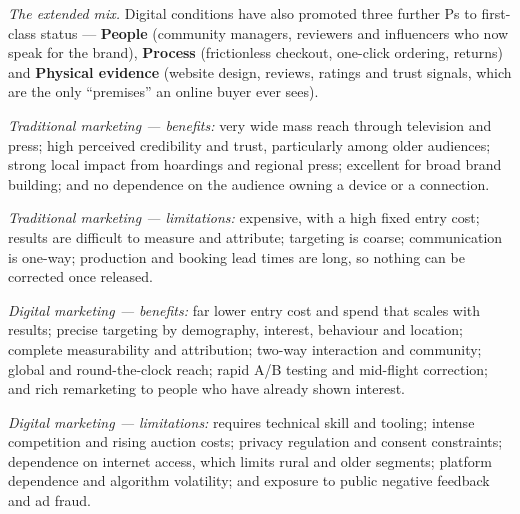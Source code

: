 \begin{qlist}
\textit{The extended mix.} Digital conditions have also promoted three further
Ps to first-class status --- \textbf{People} (community managers, reviewers and
influencers who now speak for the brand), \textbf{Process} (frictionless
checkout, one-click ordering, returns) and \textbf{Physical evidence} (website
design, reviews, ratings and trust signals, which are the only ``premises'' an
online buyer ever sees).

\textit{Traditional marketing --- benefits:} very wide mass reach through
television and press; high perceived credibility and trust, particularly among
older audiences; strong local impact from hoardings and regional press;
excellent for broad brand building; and no dependence on the audience owning a
device or a connection.

\textit{Traditional marketing --- limitations:} expensive, with a high fixed
entry cost; results are difficult to measure and attribute; targeting is coarse;
communication is one-way; production and booking lead times are long, so nothing
can be corrected once released.

\textit{Digital marketing --- benefits:} far lower entry cost and spend that
scales with results; precise targeting by demography, interest, behaviour and
location; complete measurability and attribution; two-way interaction and
community; global and round-the-clock reach; rapid A/B testing and mid-flight
correction; and rich remarketing to people who have already shown interest.

\textit{Digital marketing --- limitations:} requires technical skill and tooling;
intense competition and rising auction costs; privacy regulation and consent
constraints; dependence on internet access, which limits rural and older
segments; platform dependence and algorithm volatility; and exposure to public
negative feedback and ad fraud.


\end{qlist}

